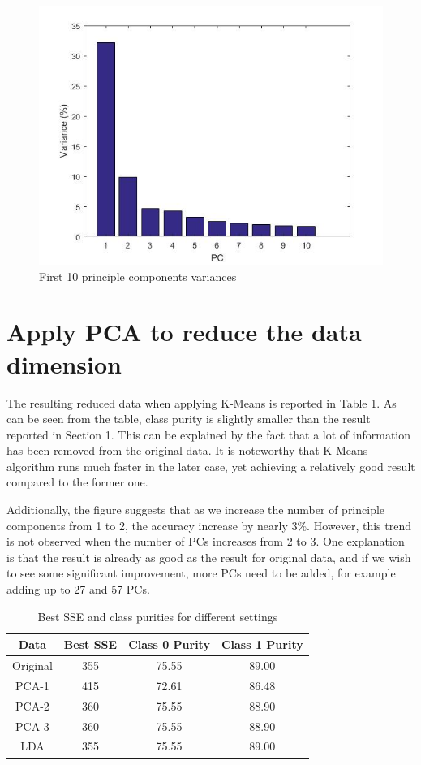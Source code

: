 \documentclass[a4paper]{article}
\begin{document}
\begin{figure}[H]
\begin{center}
\includegraphics[width=5in]{PCs.jpg}
\caption{First 10 principle components variances}
\end{center}
\end{figure}


\section{Apply PCA to reduce the data dimension}
The resulting reduced data when applying K-Means is reported in Table 1. As can be seen from the table, class purity is slightly smaller than the result reported in Section 1. This can be explained by the fact that a lot of information has been removed from the original data. It is noteworthy that K-Means algorithm runs much faster in the later case, yet achieving a relatively good result compared to the former one.

Additionally, the figure suggests that as we increase the number of principle components from 1 to 2, the accuracy increase by nearly 3\%. However, this trend is not observed when the number of PCs increases from 2 to 3. One explanation is that the result is already as good as the result for original data, and if we wish to see some significant improvement, more PCs need to be added, for example adding up to 27 and 57 PCs.


\begin{table}
\centering
\begin{tabular}{ | c | c | c | c | }
\hline
Data & Best SSE & Class 0 Purity & Class 1 Purity \\ \hline
Original & 355 & 75.55 & 89.00 \\ \hline    
PCA-1 & 415 & 72.61 & 86.48 \\ \hline
PCA-2 & 360 & 75.55 & 88.90 \\ \hline
PCA-3 & 360 & 75.55 & 88.90 \\ \hline
LDA & 355 & 75.55 & 89.00 \\ \hline
\end{tabular}
\caption{Best SSE and class purities for different settings}
\end{table}
\end{document}
